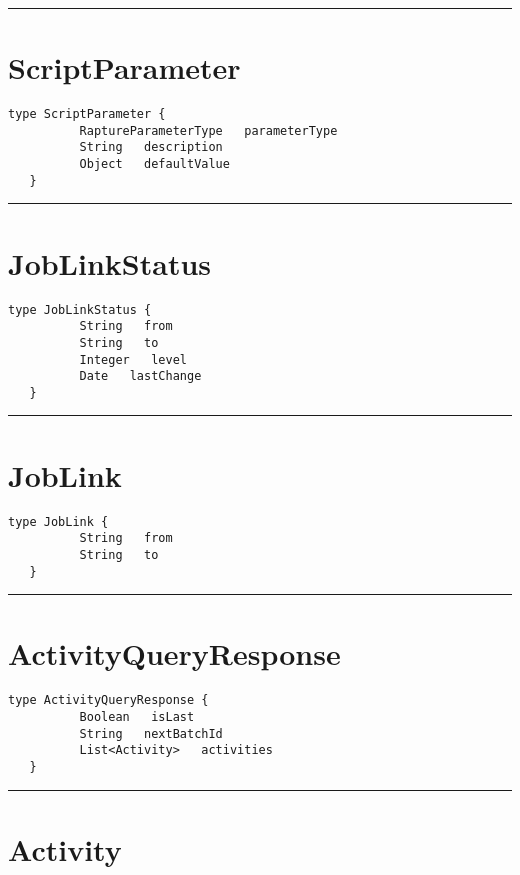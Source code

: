 \rule{12cm}{2pt}
\section{ScriptParameter}
\label{type:ScriptParameter}

\begin{lstlisting}[style=nonumbers]
   type ScriptParameter {
          RaptureParameterType   parameterType
          String   description
          Object   defaultValue
   }
\end{lstlisting}

\rule{12cm}{2pt}
\section{JobLinkStatus}
\label{type:JobLinkStatus}

\begin{lstlisting}[style=nonumbers]
   type JobLinkStatus {
          String   from
          String   to
          Integer   level
          Date   lastChange
   }
\end{lstlisting}

\rule{12cm}{2pt}
\section{JobLink}
\label{type:JobLink}

\begin{lstlisting}[style=nonumbers]
   type JobLink {
          String   from
          String   to
   }
\end{lstlisting}

\rule{12cm}{2pt}
\section{ActivityQueryResponse}
\label{type:ActivityQueryResponse}

\begin{lstlisting}[style=nonumbers]
   type ActivityQueryResponse {
          Boolean   isLast
          String   nextBatchId
          List<Activity>   activities
   }
\end{lstlisting}

\rule{12cm}{2pt}
\section{Activity}
\label{type:Activity}


